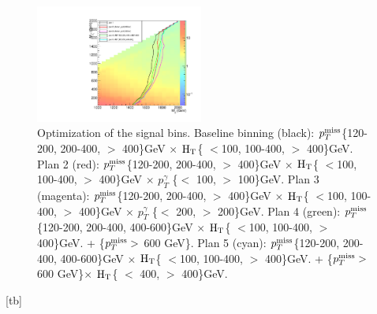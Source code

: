 \documentclass[thesis.tex]{subfiles}
\renewcommand\_{\textunderscore\allowbreak}
\begin{document}
\begin{figure}[tb]
  \centering
    \includegraphics[width=0.49\textwidth]{Figures/binningOpt.pdf}
		\caption{Optimization of the signal bins. Baseline binning (black): $p_T^\textrm{miss}$\{120-200, 200-400, $ >$ 400\}GeV $\times$ $\textrm{H}_\textrm{T}$\{ $<$100, 100-400, $ >$ 400\}GeV. Plan 2 (red): $p_T^\textrm{miss}$\{120-200, 200-400, $ >$ 400\}GeV $\times$ $\textrm{H}_\textrm{T}$\{ $<$100, 100-400, $ >$ 400\}GeV $\times$ $p_T^\gamma$ \{$<$ 100, $>$ 100\}GeV. Plan 3 (magenta): $p_T^\textrm{miss}$\{120-200, 200-400, $ >$ 400\}GeV $\times$ $\textrm{H}_\textrm{T}$\{ $<$100, 100-400, $ >$ 400\}GeV $\times$ $p_T^\gamma$ \{$<$ 200, $>$ 200\}GeV. Plan 4 (green): $p_T^\textrm{miss}$\{120-200, 200-400, 400-600\}GeV $\times$ $\textrm{H}_\textrm{T}$\{ $<$100, 100-400, $ >$ 400\}GeV. + \{$p_T^\textrm{miss} > $ 600 GeV\}. Plan 5 (cyan): $p_T^\textrm{miss}$\{120-200, 200-400, 400-600\}GeV $\times$ $\textrm{H}_\textrm{T}$\{ $<$100, 100-400, $ >$ 400\}GeV. + \{$p_T^\textrm{miss} > $ 600 GeV\}$\times$ $\textrm{H}_\textrm{T}$\{ $<$ 400, $ >$ 400\}GeV. }
    \label{fig:optbin}
\end{figure}[tb]
\end{document}
